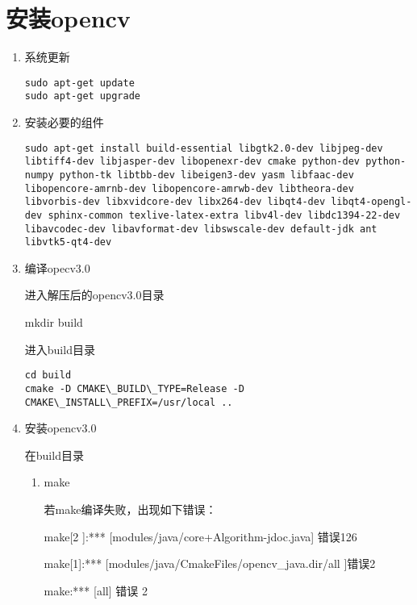 \documentclass[12pt]{article}
\begin{document}
\section{安装opencv}

\begin{enumerate}

\item 系统更新

\begin{lstlisting}
sudo apt-get update
sudo apt-get upgrade
\end{lstlisting}

\item 安装必要的组件
\begin{lstlisting}
sudo apt-get install build-essential libgtk2.0-dev libjpeg-dev libtiff4-dev libjasper-dev libopenexr-dev cmake python-dev python-numpy python-tk libtbb-dev libeigen3-dev yasm libfaac-dev libopencore-amrnb-dev libopencore-amrwb-dev libtheora-dev libvorbis-dev libxvidcore-dev libx264-dev libqt4-dev libqt4-opengl-dev sphinx-common texlive-latex-extra libv4l-dev libdc1394-22-dev libavcodec-dev libavformat-dev libswscale-dev default-jdk ant libvtk5-qt4-dev
\end{lstlisting}
\item 编译opecv3.0

进入解压后的opencv3.0目录

mkdir build

进入build目录
\begin{lstlisting}
cd build
cmake -D CMAKE\_BUILD\_TYPE=Release -D CMAKE\_INSTALL\_PREFIX=/usr/local ..
\end{lstlisting}


\item 安装opencv3.0

在build目录

\begin{enumerate}

\item make  

若make编译失败，出现如下错误：

make[2 ]:*** [modules/java/core+Algorithm-jdoc.java] 错误126

make[1]:*** [modules/java/CmakeFiles/opencv\_java.dir/all ]错误2

make:*** [all] 错误 2


\end{enumerate}
\end{enumerate}
\end{document}
